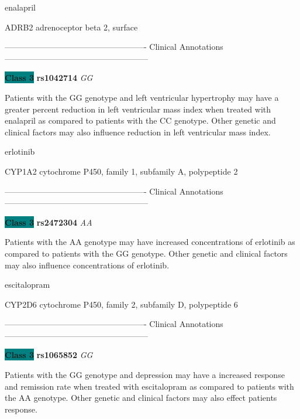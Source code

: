 \documentclass{resume} %
\begin{document}
\begin{rSection}{ enalapril }
\begin{rSubsection}{ ADRB2 }{ adrenoceptor beta 2, surface }{}{}
\item[] ---------------------------------------------------- Clinical Annotations -----------------------------------------------------\newline
\item \textbf{\colorbox{teal} {Class 3}} \textbf{ rs1042714 } \textit{ GG }
\item[] Patients with the GG genotype and left ventricular hypertrophy may have a greater percent reduction in left ventricular mass index when treated with enalapril as compared to patients with the CC genotype. Other genetic and clinical factors may also influence reduction in left ventricular mass index. 
\end{rSubsection}

\end{rSection}\begin{rSection}{ erlotinib }
\item[]

\begin{rSubsection}{ CYP1A2 }{ cytochrome P450, family 1, subfamily A, polypeptide 2 }{}{}
\item[]

\item[] ---------------------------------------------------- Clinical Annotations -----------------------------------------------------\newline
\item \textbf{\colorbox{teal} {Class 3}} \textbf{ rs2472304 } \textit{ AA }
\item[] Patients with the AA genotype may have increased concentrations of erlotinib as compared to patients with the GG genotype. Other genetic and clinical factors may also influence concentrations of erlotinib.
\end{rSubsection}

\end{rSection}\begin{rSection}{ escitalopram }
\item[]

\begin{rSubsection}{ CYP2D6 }{ cytochrome P450, family 2, subfamily D, polypeptide 6 }{}{}
\item[]

\item[] ---------------------------------------------------- Clinical Annotations -----------------------------------------------------\newline
\item \textbf{\colorbox{teal} {Class 3}} \textbf{ rs1065852 } \textit{ GG }
\item[] Patients with the GG genotype and depression may have a increased response and remission rate when treated with escitalopram as compared to patients with the AA genotype. Other genetic and clinical factors may also effect patients response.
\end{rSubsection}


\end{rSection}
\end{document}
